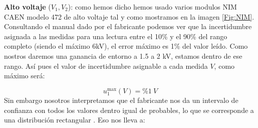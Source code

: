 \documentclass[11pt]{article}
\begin{document}
\begin{itemize}
	\begin{minipage}{0.65\linewidth}
		\item \textbf{Alto voltaje} ($V_1,V_2$): como hemos dicho hemos usado varios modulos NIM CAEN modelo 472 de alto voltaje tal y como mostramos en la imagen \ref{Fig:NIM}. Consultando el manual dado por el fabricante \cite{CAEN_N472} podemos ver que la incertidumbre asignada a las medidas para una lectura entre el 10\% y el 90\% del rango completo (siendo el máximo $6$kV), el error máximo es 1\% del valor leído. Como nostros daremos una ganancia de entorno a 1.5 a 2 kV, estamos dentro de ese rango. Así pues el valor de incertidumbre asignable a cada medida $V$, como máximo será:

		\begin{equation}
			u^{\max}_1(V) =\% 1 \ \unit{V}
		\end{equation}
		Sin embargo nosotros interpretamos que el fabricante nos da un intervalo de confianza con todos los valores dentro igual de probables, lo que se corresponde a una distribución rectangular \cite{GUM1995}. Eso nos lleva a:


\end{minipage}
\end{itemize}
\end{document}
